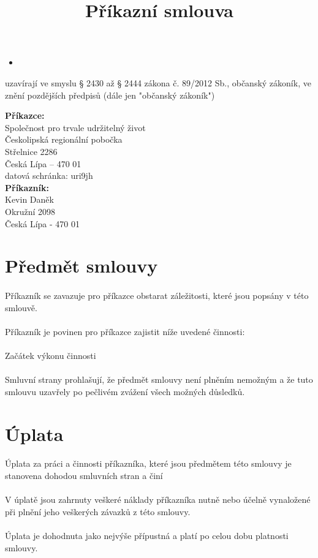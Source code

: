 \documentclass[]{article}
\title{Příkazní smlouva}
\date{}
\newcommand{\prikazce}{\textbf{Příkazce:}\\
	Společnost pro trvale udržitelný život\\
	Českolipská regionální pobočka\\
	Střelnice 2286\\
	Česká Lípa – 470 01\\
	datová schránka: uri9jh\\}
\newcommand{\prikaznik}{\textbf{Příkazník:}\\
	Kevin Daněk\\
	Okružní 2098\\
	Česká Lípa - 470 01
}
\begin{document}
\maketitle

\begin{itemize}
	\item
\end{itemize}
uzavírají ve smyslu § 2430 až § 2444 zákona č. 89/2012 Sb., občanský zákoník, ve znění pozdějších předpisů (dále jen "občanský zákoník")

\prikazce

\prikaznik

\section{Předmět smlouvy}
\paragraph{} Příkazník se zavazuje pro příkazce obstarat záležitosti, které jsou popsány v této smlouvě.
\paragraph{} Příkazník je povinen pro příkazce zajistit níže uvedené činnosti:
\paragraph{} Začátek výkonu činnosti
\paragraph{} Smluvní strany prohlašují, že předmět smlouvy není plněním nemožným a že tuto smlouvu uzavřely po pečlivém zvážení všech možných důsledků.

\section{Úplata}
\paragraph{} Úplata za práci a činnosti příkazníka, které jsou předmětem této smlouvy je stanovena dohodou smluvních stran a činí
\paragraph{} V úplatě jsou zahrnuty veškeré náklady příkazníka nutně nebo účelně vynaložené při plnění jeho veškerých závazků z této smlouvy.

\paragraph{} Úplata je dohodnuta jako nejvýše přípustná a platí po celou dobu platnosti smlouvy.
\end{document}
